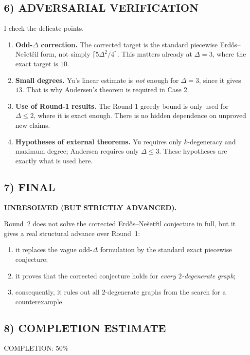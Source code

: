\subsection*{6) ADVERSARIAL VERIFICATION}
I check the delicate points.

\begin{enumerate}
\item \textbf{Odd-$\Delta$ correction.} The corrected target is the standard piecewise Erd\H{o}s--Ne\v{s}et\v{r}il form, not simply $\lceil 5\Delta^2/4\rceil$. This matters already at $\Delta=3$, where the exact target is $10$.
\item \textbf{Small degrees.} Yu's linear estimate is \emph{not} enough for $\Delta=3$, since it gives $13$. That is why Andersen's theorem is required in Case 2.
\item \textbf{Use of Round-1 results.} The Round-1 greedy bound is only used for $\Delta\le 2$, where it is exact enough. There is no hidden dependence on unproved new claims.
\item \textbf{Hypotheses of external theorems.} Yu requires only $k$-degeneracy and maximum degree; Andersen requires only $\Delta\le 3$. These hypotheses are exactly what is used here.
\end{enumerate}

\subsection*{7) FINAL}
\textbf{UNRESOLVED (BUT STRICTLY ADVANCED).}

Round~2 does not solve the corrected Erd\H{o}s--Ne\v{s}et\v{r}il conjecture in full, but it gives a real structural advance over Round~1:

\begin{enumerate}
\item it replaces the vague odd-$\Delta$ formulation by the standard exact piecewise conjecture;
\item it proves that the corrected conjecture holds for \emph{every $2$-degenerate graph};
\item consequently, it rules out all $2$-degenerate graphs from the search for a counterexample.
\end{enumerate}

\subsection*{8) COMPLETION ESTIMATE}
COMPLETION: 50\%

